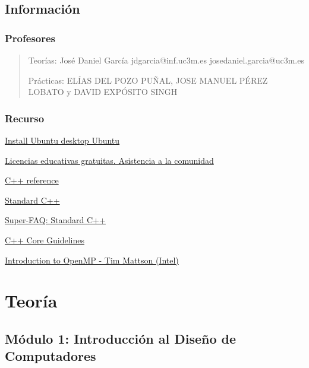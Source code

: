 \documentclass[12pt, twoside, openright]{report} %
\begin{document}
\listoffigures
\thispagestyle{fancy}





\chapter{Información}
\section{Profesores}
\begin{quote}
  Teorías: José Daniel García jdgarcia@inf.uc3m.es
  josedaniel.garcia@uc3m.es 
  
  Prácticas: ELÍAS DEL POZO PUÑAL, JOSE MANUEL
  PÉREZ LOBATO y DAVID EXPÓSITO SINGH
\end{quote}

\section{Recurso}
\href{https://ubuntu.com/tutorials/install-ubuntu-desktop\#1-overview}{Install
Ubuntu desktop \textbar{} Ubuntu}

\href{https://www.jetbrains.com/es-es/community/education/\#students}{Licencias
educativas gratuitas. Asistencia a la comunidad}

\href{https://en.cppreference.com/w/cpp}{C++ reference}

\href{https://isocpp.org/}{Standard C++}

\href{https://isocpp.org/faq}{Super-FAQ: Standard C++}

\href{http://isocpp.github.io/CppCoreGuidelines/CppCoreGuidelines}{C++
Core Guidelines}

\href{https://www.youtube.com/playlist?list=PLLX-Q6B8xqZ8n8bwjGdzBJ25X2utwnoEG}{Introduction
to OpenMP - Tim Mattson (Intel)}


\part{Teoría}

  \chapter{Módulo 1: Introducción al Diseño de Computadores}
\end{document}
